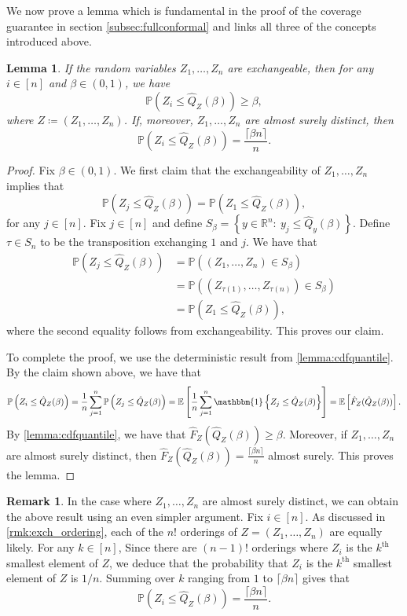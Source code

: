 \documentclass[11pt, titlepage]{article} %
\newcommand{\Prob}[1]{\mathbb{P}\left( #1 \right)}
\newcommand{\Exp}[3]{\mathbb{E}\left#2 #1 \right#3}
\newcommand{\Ind}[1]{\mathbbm{1}\left\{ #1 \right\}}
\numberwithin{equation}{section}
\newtheorem{lemma}{Lemma}
\theoremstyle{definition}
\newtheorem{remark}{Remark}
\numberwithin{theorem}{section}
\numberwithin{lemma}{section}
\numberwithin{corollary}{section}
\numberwithin{proposition}{section}
\numberwithin{definition}{section}
\numberwithin{remark}{section}
\begin{document}
\noindent
We now prove a lemma which is fundamental in the proof of the coverage guarantee in section \cref{subsec:fullconformal} and links all three of the concepts introduced above.

\begin{lemma}
    If the random variables \(Z_1, \ldots, Z_n\) are exchangeable, then for any \(i \in [n]\) and \(\beta \in (0,1)\), we have \[\Prob{Z_i \leq \hat{Q}_Z (\beta)} \geq \beta,\] where \(Z \coloneqq (Z_1, \ldots, Z_n)\). If, moreover, \(Z_1, \ldots, Z_n\) are almost surely distinct, then \[\Prob{Z_i \leq \hat{Q}_Z(\beta)} = \frac{\lceil{\beta n}\rceil}{n}.\]
\label{lemma:exch_cdfquantile}
\end{lemma}
\begin{proof}
    Fix \(\beta \in (0,1)\). We first claim that the exchangeability of \(Z_1, \ldots, Z_n\) implies that \[\Prob{Z_j \leq \hat{Q}_Z(\beta)} = \Prob{Z_1 \leq \hat{Q}_Z(\beta)}, \] for any \(j \in [n]\). Fix \(j \in [n]\) and define \(S_\beta = \left\{ y \in \mathbb{R}^n : \ y_j \leq \hat{Q}_y(\beta) \right\}.\) Define \(\tau \in S_n\) to be the transposition exchanging \(1\) and \(j\). We have that  
    \begin{align*}
        \Prob{Z_j \leq \hat{Q}_Z(\beta)} &= \Prob{(Z_1, \ldots, Z_n) \in S_\beta} \\
        &= \Prob{(Z_{\tau(1)}, \ldots, Z_{\tau(n)}) \in S_\beta} \\
        &= \Prob{Z_1 \leq \hat{Q}_Z(\beta)},
    \end{align*} where the second equality follows from exchangeability. This proves our claim. \vskip 5pt
    
    \noindent
    To complete the proof, we use the deterministic result from \cref{lemma:cdfquantile}. By the claim shown above, we have that \begin{align*}
        \Prob{Z_i \leq \hat{Q}_Z(\beta)} = \frac{1}{n} \sum_{j=1}^n \Prob{Z_j \leq \hat{Q}_Z(\beta)} = \mathbb{E} \left[ \frac{1}{n} \sum_{j=1}^n \Ind{Z_j \leq \hat{Q}_Z(\beta)} \right]
        = \Exp{\hat{F}_Z(\hat{Q}_Z(\beta))}{[}{]}.
    \end{align*} By \cref{lemma:cdfquantile}, we have that \(\hat{F}_Z(\hat{Q}_Z(\beta)) \geq \beta\). Moreover, if \(Z_1, \ldots, Z_n\) are almost surely distinct, then \(\hat{F}_Z(\hat{Q}_Z(\beta)) = \frac{\lceil{\beta n}\rceil}{n}\) almost surely. This proves the lemma.
\end{proof}

\begin{remark}
    In the case where \(Z_1, \ldots, Z_n\) are almost surely distinct, we can obtain the above result using an even simpler argument. Fix \(i \in [n]\). As discussed in \cref{rmk:exch_ordering}, each of the \(n!\) orderings of \(Z = (Z_1, \ldots, Z_n)\) are equally likely. For any \(k \in [n]\), Since there are \((n-1)!\) orderings where \(Z_i\) is the \(k^\mathrm{th}\) smallest element of \(Z\), we deduce that the probability that \(Z_i\) is the \(k^\mathrm{th}\) smallest element of \(Z\) is \(1/n\). Summing over \(k\) ranging from \(1\) to \(\lceil \beta n \rceil\) gives that \[\Prob{Z_i \leq \hat{Q}_Z(\beta)} = \frac{\lceil{\beta n}\rceil}{n}.\]
\label{rmk:exch_rank_argument}
\end{remark}
\end{document}
